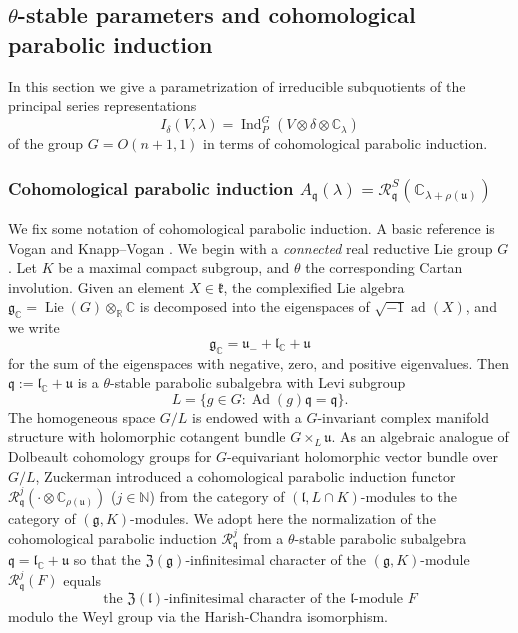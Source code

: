 \subsection{$\theta$-stable parameters
 and cohomological parabolic induction}
\label{subsec:thetapara}

In this section
 we give a parametrization of irreducible subquotients
 of the principal series representations
\[
    I_{\delta}(V,\lambda)={\operatorname{Ind}}_P^G(V \otimes \delta \otimes {\mathbb{C}}_{\lambda})
\]
 of the group $G=O(n+1,1)$ in terms of cohomological parabolic induction.  

\subsubsection{Cohomological parabolic induction $A_{\mathfrak{q}}(\lambda)={\mathcal{R}}_{\mathfrak{q}}^S({\mathbb{C}}_{\lambda+\rho({\mathfrak{u}})})$}
\label{subsec:Aqgeneral}
We fix some notation of
 cohomological parabolic induction.  
A basic reference is Vogan \cite{Vogan81} and Knapp--Vogan \cite{KV}.  
We begin with a {\it{connected}} real reductive Lie group $G$.  
Let $K$ be a maximal compact subgroup, 
 and $\theta$ the corresponding Cartan involution.  
Given an element $X \in {\mathfrak{k}}$, 
 the complexified Lie algebra
 ${\mathfrak{g}}_{\mathbb{C}}={\operatorname{Lie}}(G) \otimes_{\mathbb{R}}
{\mathbb{C}}$ is decomposed into the eigenspaces
 of $\sqrt{-1}{\operatorname{ad}}(X)$, 
 and we write 
\[
   {\mathfrak{g}}_{\mathbb{C}}
   ={\mathfrak{u}}_- + {\mathfrak{l}}_{\mathbb{C}} + {\mathfrak{u}}
\]
 for the sum of the eigenspaces 
 with negative, zero, 
 and positive eigenvalues.  
Then ${\mathfrak{q}}:={\mathfrak{l}}_{\mathbb{C}}+{\mathfrak{u}}$
 is a $\theta$-stable parabolic subalgebra 
 with Levi subgroup 
\begin{equation}
\label{eqn:LeviLq}
   L =\{g \in G: {\operatorname{Ad}}(g) {\mathfrak{q}}={\mathfrak{q}}\}.  
\end{equation}
The homogeneous space $G/L$ is endowed
 with a $G$-invariant complex manifold structure 
 with holomorphic cotangent bundle $G \times_L {\mathfrak{u}}$.  
As an algebraic analogue of Dolbeault cohomology groups
 for $G$-equivariant holomorphic vector bundle over $G/L$, 
 Zuckerman introduced a cohomological parabolic induction functor
 ${\mathcal{R}}_{\mathfrak{q}}^j(\cdot \otimes {\mathbb{C}}
_{\rho({\mathfrak{u}})})$ ($j \in {\mathbb{N}}$) from the category
 of $({\mathfrak{l}}, L \cap K)$-modules
 to the category of $({\mathfrak{g}}, K)$-modules. 
We adopt here the normalization of the cohomological parabolic induction
 ${\mathcal{R}}_{{\mathfrak {q}}}^{j}$ from a $\theta$-stable parabolic subalgebra
 ${\mathfrak {q}}={\mathfrak {l}}_{\mathbb{C}}+{\mathfrak {u}}$
 so that the ${\mathfrak{Z}}({\mathfrak {g}})$-infinitesimal character
 of the $({\mathfrak{g}},K)$-module 
 ${\mathcal{R}}_{{\mathfrak {q}}}^{j}(F)$ equals
\[
\text{
 the ${\mathfrak{Z}}({\mathfrak {l}})$-infinitesimal character
 of the ${\mathfrak {l}}$-module $F$
}
\]
 modulo the Weyl group 
 via the Harish-Chandra isomorphism.  

